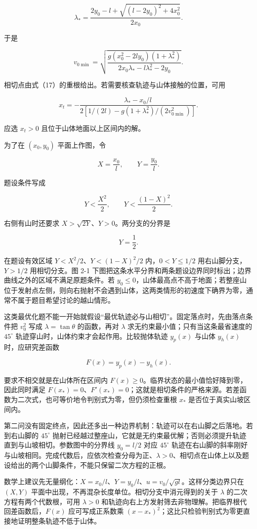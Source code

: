 \documentclass[12pt,a4paper,UTF8]{ctexart}
\begin{document}
\[\boxed{
\lambda_*
=\frac{2y_0-l+\sqrt{(l-2y_0)^2+4x_0^2}}{2x_0}
}. \tag{20}\]

于是

\[\boxed{
v_{0\min}
=\sqrt{
\frac{g(x_0^2-2ly_0)(1+\lambda_*^2)}
{2x_0\lambda_*-l\lambda_*^2-2y_0}
}
}. \tag{21}\]

相切点由式（17）的重根给出。若需要核查轨迹与山体接触的位置，可用

\[x_t=-\frac{\lambda_*-x_0/l}
{2\left[1/(2l)-g(1+\lambda_*^2)/(2v_{0\min}^2)\right]}. \tag{22}\]

应选 \(x_t>0\) 且位于山体地面以上区间内的解。

为了在 \((x_0,y_0)\) 平面上作图，令

\[X=\frac{x_0}{l},\qquad Y=\frac{y_0}{l}.\]

题设条件写成

\[Y<\frac{X^2}{2},\qquad Y<\frac{(1-X)^2}{2}. \tag{23}\]

右侧有山时还要求 \(X>\sqrt{2Y}\)、\(Y>0\)。两分支的分界是

\[\boxed{Y=\frac12}. \tag{24}\]

在题设有效区域 \(Y<X^2/2\)、\(Y<(1-X)^2/2\) 内，\(0<Y\le1/2\)
用右山脚分支，\(Y>1/2\) 用相切分支。图 2-1
下图把这条水平分界和两条题设边界同时标出；边界曲线之外的区域不满足原题条件。若
\(y_0\leq0\)，山体最高点不高于地面；若整座山位于发射点左侧，则向右抛射不会遇到山体，这两类情形的初速度下确界为零，通常不属于题目希望讨论的越山情形。

这类最优化题不能一开始就假设``最优轨迹必与山相切''。固定落点时，先由落点条件把
\(v_0^2\) 写成 \(\lambda=\tan\theta\) 的函数，再对 \(\lambda\)
求无约束最小值；只有当这条最省速度的 \(45^\circ\)
轨迹穿山时，山体约束才会起作用。比较抛体轨迹 \(y_p(x)\) 与山体
\(y_h(x)\) 时，应研究差函数

\[F(x)=y_p(x)-y_h(x).\]

要求不相交就是在山体所在区间内
\(F(x)\geqslant0\)。临界状态的最小值恰好降到零，因此同时满足
\(F(x_*)=0\)、\(F'(x_*)=0\)；这就是相切条件的严格来源。若差函数为二次式，也可等价地令判别式为零，但仍须检查重根
\(x_*\) 是否位于真实山坡区间内。

第二问没有固定终点，因此还多出一种边界机制：轨迹可以在右山脚之后落地。若到右山脚的
\(45^\circ\)
抛射已经越过整座山，它就是无约束最优解；否则必须提升轨迹直到与山坡相切。参数图中的分界线
\(y_0=l/2\) 对应 \(45^\circ\)
轨迹在右山脚的斜率刚好与山坡相同。完成代数后，应依次检查分母为正、\(\lambda>0\)、相切点在山体上以及题设给出的两个山脚条件，不能只保留二次方程的正根。

数学上建议先无量纲化：\(X=x_0/l\)、\(Y=y_0/l\)、\(u=v_0/\sqrt{gl}\)。这样分类边界只在
\((X,Y)\) 平面中出现，不再混杂长度单位。相切分支中消元得到的关于
\(\lambda\) 的二次方程有两个代数根，可用 \(\lambda>0\)
和轨迹向右上方发射筛去非物理解。把临界根代回差函数后，\(F(x)\)
应可写成正系数乘
\((x-x_*)^2\)；这比只检验判别式为零更直接地证明整条轨迹不低于山体。
\end{document}
